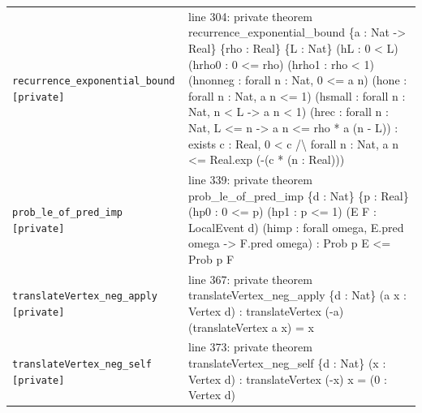 \documentclass[10pt]{article}
\begin{document}
\begin{longtable}{>{\raggedright\arraybackslash}p{} >{\raggedright\arraybackslash}p{}}
\texttt{recurrence\_\allowbreak{}exponential\_\allowbreak{}bound [private]} & {\ttfamily\scriptsize line 304:\allowbreak{} private theorem recurrence\_\allowbreak{}exponential\_\allowbreak{}bound \{a :\allowbreak{} Nat -\allowbreak{}> Real\} \{rho :\allowbreak{} Real\} \{L :\allowbreak{} Nat\} (\allowbreak{}hL :\allowbreak{} 0 < L)\allowbreak{} (\allowbreak{}hrho0 :\allowbreak{} 0 <=\allowbreak{} rho)\allowbreak{} (\allowbreak{}hrho1 :\allowbreak{} rho < 1)\allowbreak{} (\allowbreak{}hnonneg :\allowbreak{} forall n :\allowbreak{} Nat,\allowbreak{} 0 <=\allowbreak{} a n)\allowbreak{} (\allowbreak{}hone :\allowbreak{} forall n :\allowbreak{} Nat,\allowbreak{} a n <=\allowbreak{} 1)\allowbreak{} (\allowbreak{}hsmall :\allowbreak{} forall n :\allowbreak{} Nat,\allowbreak{} n < L -\allowbreak{}> a n < 1)\allowbreak{} (\allowbreak{}hrec :\allowbreak{} forall n :\allowbreak{} Nat,\allowbreak{} L <=\allowbreak{} n -\allowbreak{}> a n <=\allowbreak{} rho *\allowbreak{} a (\allowbreak{}n -\allowbreak{} L)\allowbreak{})\allowbreak{} :\allowbreak{} exists c :\allowbreak{} Real,\allowbreak{} 0 < c /\allowbreak{}\textbackslash{} forall n :\allowbreak{} Nat,\allowbreak{} a n <=\allowbreak{} Real.\allowbreak{}exp (\allowbreak{}-\allowbreak{}(\allowbreak{}c *\allowbreak{} (\allowbreak{}n :\allowbreak{} Real)\allowbreak{})\allowbreak{})\allowbreak{}} \\[0.45em]
\texttt{prob\_\allowbreak{}le\_\allowbreak{}of\_\allowbreak{}pred\_\allowbreak{}imp [private]} & {\ttfamily\scriptsize line 339:\allowbreak{} private theorem prob\_\allowbreak{}le\_\allowbreak{}of\_\allowbreak{}pred\_\allowbreak{}imp \{d :\allowbreak{} Nat\} \{p :\allowbreak{} Real\} (\allowbreak{}hp0 :\allowbreak{} 0 <=\allowbreak{} p)\allowbreak{} (\allowbreak{}hp1 :\allowbreak{} p <=\allowbreak{} 1)\allowbreak{} (\allowbreak{}E F :\allowbreak{} LocalEvent d)\allowbreak{} (\allowbreak{}himp :\allowbreak{} forall omega,\allowbreak{} E.\allowbreak{}pred omega -\allowbreak{}> F.\allowbreak{}pred omega)\allowbreak{} :\allowbreak{} Prob p E <=\allowbreak{} Prob p F} \\[0.45em]
\texttt{translateVertex\_\allowbreak{}neg\_\allowbreak{}apply [private]} & {\ttfamily\scriptsize line 367:\allowbreak{} private theorem translateVertex\_\allowbreak{}neg\_\allowbreak{}apply \{d :\allowbreak{} Nat\} (\allowbreak{}a x :\allowbreak{} Vertex d)\allowbreak{} :\allowbreak{} translateVertex (\allowbreak{}-\allowbreak{}a)\allowbreak{} (\allowbreak{}translateVertex a x)\allowbreak{} =\allowbreak{} x} \\[0.45em]
\texttt{translateVertex\_\allowbreak{}neg\_\allowbreak{}self [private]} & {\ttfamily\scriptsize line 373:\allowbreak{} private theorem translateVertex\_\allowbreak{}neg\_\allowbreak{}self \{d :\allowbreak{} Nat\} (\allowbreak{}x :\allowbreak{} Vertex d)\allowbreak{} :\allowbreak{} translateVertex (\allowbreak{}-\allowbreak{}x)\allowbreak{} x =\allowbreak{} (\allowbreak{}0 :\allowbreak{} Vertex d)\allowbreak{}} \\[0.45em]

\end{longtable}
\end{document}
